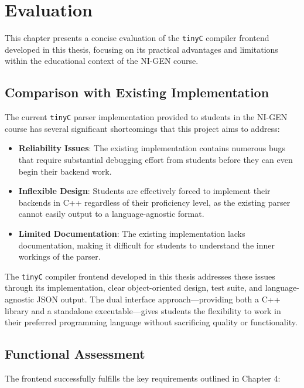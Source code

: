 \chapter{Evaluation}

This chapter presents a concise evaluation of the \texttt{tinyC} compiler frontend developed in this thesis, focusing on its practical advantages and limitations within the educational context of the NI-GEN course.

\section{Comparison with Existing Implementation}

The current \texttt{tinyC} parser implementation provided to students in the NI-GEN course has several significant shortcomings that this project aims to address:

\begin{itemize}
    \item \textbf{Reliability Issues}: The existing implementation contains numerous bugs that require substantial debugging effort from students before they can even begin their backend work.
    
    \item \textbf{Inflexible Design}: Students are effectively forced to implement their backends in C++ regardless of their proficiency level, as the existing parser cannot easily output to a language-agnostic format.
    
    \item \textbf{Limited Documentation}: The existing implementation lacks documentation, making it difficult for students to understand the inner workings of the parser.
\end{itemize}

The \texttt{tinyC} compiler frontend developed in this thesis addresses these issues through its implementation, clear object-oriented design, test suite, and language-agnostic JSON output. The dual interface approach—providing both a C++ library and a standalone executable—gives students the flexibility to work in their preferred programming language without sacrificing quality or functionality.

\section{Functional Assessment}

The frontend successfully fulfills the key requirements outlined in Chapter 4:

